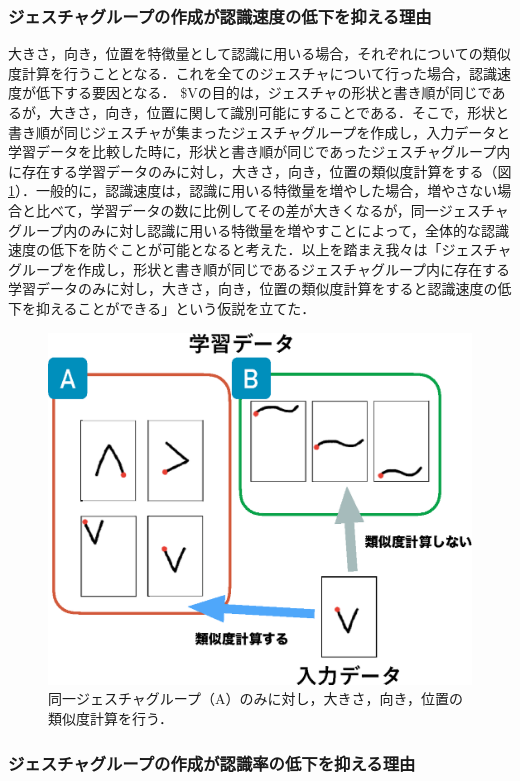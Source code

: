\subsubsection{ジェスチャグループの作成が認識速度の低下を抑える理由}

大きさ，向き，位置を特徴量として認識に用いる場合，それぞれについての類似度計算を行うこととなる．これを全てのジェスチャについて行った場合，認識速度が低下する要因となる．
\$Vの目的は，ジェスチャの形状と書き順が同じであるが，大きさ，向き，位置に関して識別可能にすることである．そこで，形状と書き順が同じジェスチャが集まったジェスチャグループを作成し，入力データと学習データを比較した時に，形状と書き順が同じであったジェスチャグループ内に存在する学習データのみに対し，大きさ，向き，位置の類似度計算をする（図\ref{fig:speed_reason}）．一般的に，認識速度は，認識に用いる特徴量を増やした場合，増やさない場合と比べて，学習データの数に比例してその差が大きくなるが，同一ジェスチャグループ内のみに対し認識に用いる特徴量を増やすことによって，全体的な認識速度の低下を防ぐことが可能となると考えた．以上を踏まえ我々は「ジェスチャグループを作成し，形状と書き順が同じであるジェスチャグループ内に存在する学習データのみに対し，大きさ，向き，位置の類似度計算をすると認識速度の低下を抑えることができる」という仮説を立てた．

\begin{figure} [h!]
	\begin{center}
		\includegraphics [width=0.6\hsize ]{img/speed_reason.eps}
	\end{center}
	\caption{同一ジェスチャグループ（A）のみに対し，大きさ，向き，位置の類似度計算を行う．}
	\label{fig:speed_reason}
\end{figure}

\subsubsection{ジェスチャグループの作成が認識率の低下を抑える理由}


